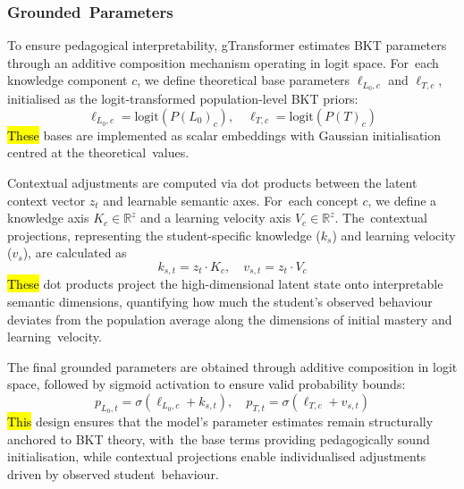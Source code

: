 \documentclass[applsci,article,accept,moreauthors,pdftex]{Definitions/mdpi}
\begin{document}
\subsubsection{Grounded~Parameters} \label{sec_grounded_params}

To ensure pedagogical interpretability, gTransformer estimates BKT parameters through an additive composition mechanism operating in logit space. For~each knowledge component $c$, we define theoretical base parameters $\ell_{L_0,c}$ and $\ell_{T,c}$, {initialised} as the logit-transformed population-level BKT priors:
\begin{equation} \label{eq:theory_base}
    \ell_{L_0,c} = \text{logit}(P(L_0)_c), \quad \ell_{T,c} = \text{logit}(P(T)_c)
\end{equation}
\hl{These} %
 bases are implemented as scalar embeddings with Gaussian {initialisation} {centred} at the theoretical~values.

Contextual adjustments are computed via dot products between the latent context vector $z_t$ and learnable semantic axes. For~each concept $c$, we define a knowledge axis $K_{c} \in \mathbb{R}^{z}$ and a learning velocity axis $V_{c} \in \mathbb{R}^{z}$. The~contextual projections, representing the student-specific knowledge ($k_s$) and learning velocity ($v_s$), are calculated as
\begin{equation} \label{eq:contextual_projection}
    k_{s,t} = z_t \cdot K_c, \quad v_{s,t} = z_t \cdot V_c
\end{equation}
\hl{These} dot products project the high-dimensional latent state onto interpretable semantic dimensions, quantifying how much the student's observed {behaviour} deviates from the population average along the dimensions of initial mastery and learning~velocity.

The final grounded parameters are obtained through additive composition in logit space, followed by sigmoid activation to ensure valid probability bounds:
\begin{equation} \label{eq:grounded_params}
    p_{L_0,t} = \sigma(\ell_{L_0,c} + k_{s,t}), \quad p_{T,t} = \sigma(\ell_{T,c} + v_{s,t})
\end{equation}
\hl{This} design ensures that the model's parameter estimates remain structurally anchored to BKT theory, with~the base terms providing pedagogically sound {initialisation}, while contextual projections enable {individualised} adjustments driven by observed student~{behaviour}.
\end{document}
